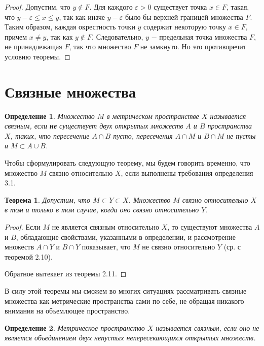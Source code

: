 \documentclass{article}
\newtheorem{theorem}{Теорема}[section]
\newtheorem{definition}{Определение}[section]
\begin{document}
\begin{proof}
Допустим, что \(y \notin F\). Для каждого \(\varepsilon > 0\) существует точка \(x \in F\), такая, что \(y - \varepsilon \leq x \leq y\), так как иначе \(y - \varepsilon\) было бы верхней границей множества \(F\). Таким образом, каждая окрестность точки \(y\) содержит некоторую точку \(x \in F\), причем \(x \neq y\), так как \(y \notin F\). Следовательно, \(y\) \(-\) предельная точка множества \(F\), не принадлежащая \(F\), так что множество \(F\) не замкнуто. Но это противоречит условию теоремы.
\end{proof}

\section{Связные множества}

\begin{definition}
Множество \(M\) в метрическом пространстве \(X\) называется связным, если \textbf{не} существует двух открытых множеств \(A\) и \(B\) пространства \(X\), таких, что пересечение \( A \cap B\) пусто, пересечения \(A \cap M\) и \(B \cap M\) не пусты и \(M \subset A \cup B\).
\end{definition}

Чтобы сформулировать следующую теорему, мы будем говорить временно, что множество \(M\) связно относительно \(X\), если выполнены требования определения 3.1.

\begin{theorem}
Допустим, что \(M \subset Y \subset X\). Множество \(M\) связно относительно \(X\) в том и только в том случае, когда оно связно относительно \(Y\).
\end{theorem}

\begin{proof}
Если \(M\) не является связным относительно \(X\), то существуют множества \(A\) и \(B\), обладающие свойствами, указанными в определении, и рассмотрение множеств \(A \cap Y\) и \(B \cap Y\) показывает, что \(M\) не связно относительно \(Y\) (ср. с теоремой 2.10).

Обратное вытекает из теоремы 2.11.
\end{proof}

В силу этой теоремы мы сможем во многих ситуациях рассматривать связные множества как метрические пространства сами по себе, не обращая никакого внимания на объемлющее пространство.

\begin{definition}
Метрическое пространство \(X\) называется связным, если оно не является объединением двух непустых непересекающихся открытых множеств.
\end{definition}
\end{document}
